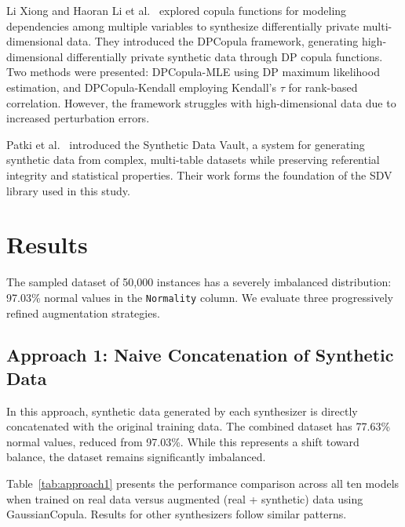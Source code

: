 \documentclass[conference]{IEEEtran}
\begin{document}
Li Xiong and Haoran Li et al.~\cite{dpcopula} explored copula functions for modeling dependencies among multiple variables to synthesize differentially private multi-dimensional data. They introduced the DPCopula framework, generating high-dimensional differentially private synthetic data through DP copula functions. Two methods were presented: DPCopula-MLE using DP maximum likelihood estimation, and DPCopula-Kendall employing Kendall's $\tau$ for rank-based correlation. However, the framework struggles with high-dimensional data due to increased perturbation errors.

Patki et al.~\cite{sdvpaper} introduced the Synthetic Data Vault, a system for generating synthetic data from complex, multi-table datasets while preserving referential integrity and statistical properties. Their work forms the foundation of the SDV library used in this study.

\section{Results}

The sampled dataset of 50,000 instances has a severely imbalanced distribution: 97.03\% normal values in the \texttt{Normality} column. We evaluate three progressively refined augmentation strategies.

\subsection{Approach 1: Naive Concatenation of Synthetic Data}
In this approach, synthetic data generated by each synthesizer is directly concatenated with the original training data. The combined dataset has 77.63\% normal values, reduced from 97.03\%. While this represents a shift toward balance, the dataset remains significantly imbalanced.

Table~\ref{tab:approach1} presents the performance comparison across all ten models when trained on real data versus augmented (real + synthetic) data using GaussianCopula. Results for other synthesizers follow similar patterns.
\end{document}
